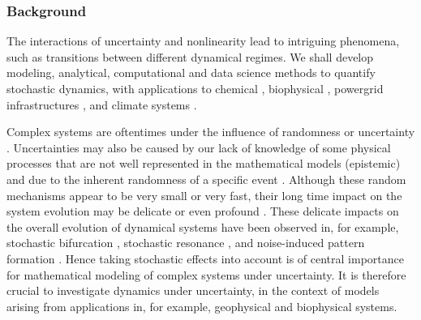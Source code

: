 \documentclass[11pt]{NSFamsart}
\begin{document}
\subsubsection*{Background} The interactions of uncertainty and nonlinearity lead to intriguing phenomena, such as  transitions   between  different dynamical regimes. We shall develop modeling, analytical, computational and data science  methods to quantify stochastic dynamics, with applications to chemical \cite{agaoglou_chemical_2019}, biophysical \cite{Ruoff2018BiologicalCR}, powergrid infrastructures \cite{MEDJROUBI201714}, and climate systems \cite{Alexandrov2020NonlinearCD, Franzke2017NonlinearAS, Wan2020ADF}. 
 
Complex systems are oftentimes under the influence of randomness or uncertainty \cite{Moss1, Horst, Gar, VanKampen3}. Uncertainties may also be caused by our lack of knowledge of some physical processes that are not well represented in the mathematical models (epistemic) and due to the inherent randomness of a specific event  \cite{Palmer1, Kantz, Wilks, Williams}.
Although these random mechanisms appear to be very small or very fast, their long time impact on the system evolution may be delicate or even profound \cite{Arnold, DuanBook2015}. These delicate impacts on the overall evolution of dynamical systems have been observed in, for example, stochastic bifurcation
\cite{Crauel, CarLanRob01, Horst}, stochastic resonance \cite{imkeller2002model},
 and  noise-induced pattern formation \cite{Gar, blomker2003pattern}.
Hence taking stochastic effects   into account is of
central importance for mathematical modeling of
complex systems under uncertainty.   It is therefore crucial to investigate dynamics under uncertainty, in the context of models arising from applications in, for example, geophysical and biophysical systems. 
\end{document}
